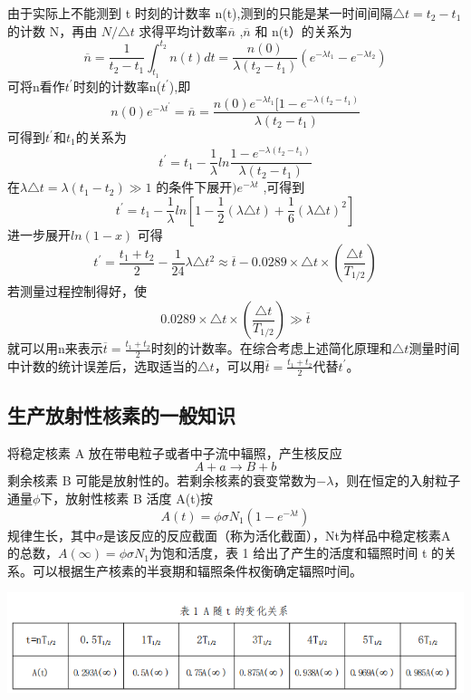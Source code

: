 \documentclass[hyperref]{ctexart}
\begin{document}
\begin{multicols}{2}
	由于实际上不能测到 t 时刻的计数率 n(t),测到的只能是某一时间间隔$\triangle t=t_2-t_1$的计数 N，再由 $N/\triangle t$ 求得平均计数率$\overline{n}$ ,$\overline{n}$ 和 n(t）的关系为
	\begin{equation}
	\overline{n}=\frac{1}{t_2-t_1} \int_{t_1}^{t_2}n(t)dt = \frac{n(0)}{\lambda (t_2-t_1)}(e^{-\lambda t_1}-e^{-\lambda t_2})
	\end{equation}
	可将n看作$t^{\prime}$时刻的计数率n($t^{\prime}$),即
	\begin{equation}
	n(0)e^{-\lambda t^{\prime}}=\overline{n}=\frac{n(0)e^{-\lambda t_1}[1-e^{-\lambda (t_2-t_1)}}{\lambda (t_2-t_1)}
	\end{equation}
	可得到$t^{\prime}$和$t_1$的关系为
	\begin{equation}
	t^{\prime}=t_1-\frac{1}{\lambda}ln\frac{1-e^{-\lambda (t_2-t_1)}}{\lambda (t_2-t_1)}
	\end{equation}
	在$\lambda \triangle t = \lambda(t_1-t_2) \gg 1$ 的条件下展开$)e^{-\lambda t}$ ,可得到
	\begin{equation}
	t^{\prime}=t_1-\frac{1}{\lambda}ln[1-\frac{1}{2}(\lambda \triangle t)+\frac{1}{6}(\lambda \triangle t)^2]
	\end{equation}
	进一步展开$ln(1-x)$ 可得
	\begin{equation}
	t^{\prime}=\frac{t_1+t_2}{2}-\frac{1}{24}\lambda \triangle t^2 \approx \overline{t}-0.0289 \times \triangle t \times (\frac{\triangle t}{T_{1/2}})
	\end{equation}
	若测量过程控制得好，使
	\begin{equation}
	0.0289 \times \triangle t \times (\frac{\triangle t}{T_{1/2}}) \gg \overline{t}
	\end{equation}
	就可以用n来表示$\overline{t}=\frac{t_1+t_2}{2}$时刻的计数率。在综合考虑上述简化原理和$\triangle t$测量时间中计数的统计误差后，选取适当的$\triangle t$，可以用$\overline{t}=\frac{t_1+t_2}{2}$代替$t^{\prime}$。

	\subsection{生产放射性核素的一般知识}
	将稳定核素 A 放在带电粒子或者中子流中辐照，产生核反应 $$ A+a \rightarrow B+b $$ 剩余核素 B 可能是放射性的。若剩余核素的衰变常数为$-\lambda$，则在恒定的入射粒子通量$\phi$下，放射性核素 B 活度 A(t)按
	\begin{equation}
	A(t)=\phi \sigma N_1 (1-e^{-\lambda t})
	\end{equation}
	规律生长，其中$\sigma$是该反应的反应截面（称为活化截面），Nt为样品中稳定核素A 的总数，$A(\infty)=\phi \sigma N_1$为饱和活度，表 1 给出了产生的活度和辐照时间 t 的关系。可以根据生产核素的半衰期和辐照条件权衡确定辐照吋间。
	\begin{center}\includegraphics[scale=0.3]{b61}\end{center}


\end{multicols}
\end{document}
